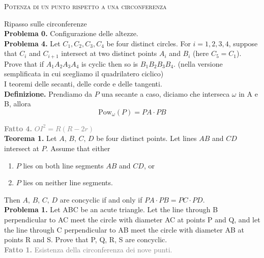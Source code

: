\documentclass[a4paper]{article}
\theoremstyle{remark}
\theoremstyle{definition}
\begin{document}
\newpage
\begin{center}
	\textsc{Potenza di un punto rispetto a una circonferenza}
\end{center}
\begin{multicols}{2}
	
	Ripasso sulle circonferenze \\
	
	\textbf{Problema 0.} Configurazione delle altezze. \\
	
	\textbf{Problema 4.} Let $ C_1, C_2, C_3, C_4 $ be four distinct circles. For $ i = 1, 2, 3, 4 $,
	suppose that $ C_i  $ and $ C_{i+1}  $ intersect at two distinct points $ A_i $ and $ B_i $ (here $ C_5 = C_1 $). Prove that if $ A_1A_2A_3A_4 $ is cyclic then so is $ B_1B_2B_3B_4 $. \textsf{(nella versione semplificata in cui scegliamo il quadrilatero ciclico)} \\
	
	I teoremi delle secanti, delle corde e delle tangenti. \\
	
	\textbf{Definizione.} Prendiamo da $ P $ una secante a caso, diciamo che interseca $ \omega $ in A e B, allora 
	\[ \text{Pow}_{\omega}(P) = PA \cdot PB \]
	
	\textcolor{gray}{\textbf{Fatto 4.} $ OI^2 = R(R-2r) $} \\
	
	\textbf{Teorema 1.} Let $ A,\, B,\, C,\, D $ be four distinct points. Let lines $ AB $
	and $ CD $ intersect at $ P $. Assume that either
	\begin{enumerate}
		\item $ P $ lies on both line segments $ AB $ and $ CD $, or
		\item $ P $ lies on neither line segments.
	\end{enumerate}
	Then $ A,\, B,\, C,\, D $ are concyclic if and only if $ PA\cdot PB  = PC\cdot PD$. \\
	
	\textbf{Problema 1.} Let ABC be an acute triangle. Let the line through B perpendicular to AC meet the
	circle with diameter AC at points P and Q, and let the line through C perpendicular
	to AB meet the circle with diameter AB at points R and S. Prove that P, Q, R, S are
	concyclic. \\
	
	\textcolor{gray}{\textbf{Fatto 1.} Esistenza della circonferenza dei nove punti.} \\
	

\end{multicols}
\end{document}

